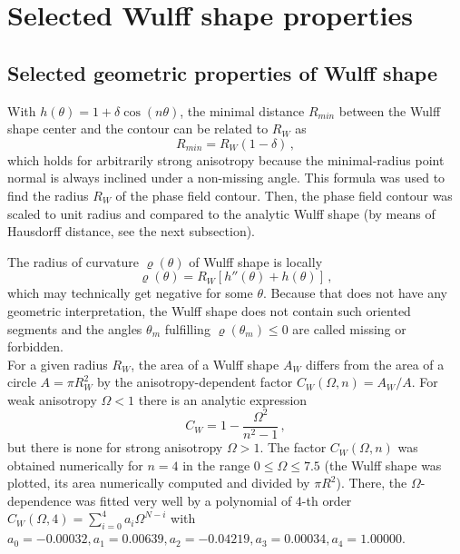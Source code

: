 \chapter{Selected Wulff shape properties} \label{ch_appendix_wulff_properties}
\section{Selected geometric properties of Wulff shape}\label{sec_appendix_anisofun_props}
With $h(\theta)=1+\delta\cos(n\theta)$, the minimal distance $R_{min}$ between the Wulff shape center and the contour can be related to $R_W$ as
\begin{equation} \label{eq_appdx_wulff_minradius}
	R_{min} = R_W(1-\delta) \,,
\end{equation}
which holds for arbitrarily strong anisotropy because the minimal-radius point normal is always inclined under a non-missing angle. This formula was used to find the radius $R_W$ of the phase field contour. Then, the phase field contour was scaled to unit radius and compared to the analytic Wulff shape (by means of Hausdorff distance, see the next subsection). 

The radius of curvature $\varrho(\theta)$ of Wulff shape is locally
\begin{equation} \label{eq_Wulff_radius_curvature}
	\varrho(\theta) = R_W[h''(\theta) + h(\theta)] \,,
\end{equation}
which may technically get negative for some $\theta$. Because that does not have any geometric interpretation, the Wulff shape does not contain such oriented segments and the angles $\theta_m$ fulfilling $\varrho(\theta_m)\leq0$ are called missing or forbidden. \\

For a given radius $R_W$, the area of a Wulff shape $A_W$ differs from the area of a circle $A=\pi R_W^2$ by the anisotropy-dependent factor $C_W(\Omega,n) = A_W/A$. For weak anisotropy $\Omega<1$ there is an analytic expression 
\begin{equation}
	C_W = 1-\frac{\Omega^2}{n^2-1} \,,
\end{equation}
but there is none for strong anisotropy $\Omega>1$. The factor $C_W(\Omega,n)$ was obtained numerically for $n=4$ in the range $0\leq\Omega\leq7.5$ (the Wulff shape was plotted, its area numerically computed and divided by $\pi R^2$). There, the $\Omega$-dependence was fitted very well  by a polynomial of 4-th order $C_W(\Omega,4)= \sum_{i=0}^4a_i\Omega^{N-i}$ with $a_0=-0.00032 ,a_1=0.00639 ,a_2=-0.04219 , a_3=0.00034 , a_4=1.00000$. 

